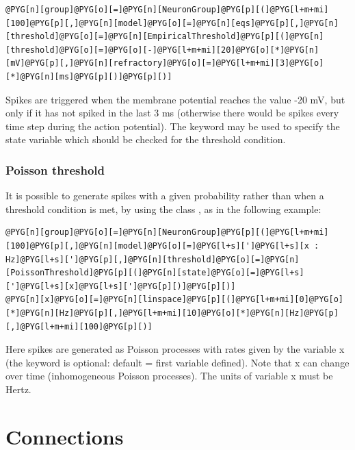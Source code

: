 \documentclass[letterpaper,10pt,english]{manual}
\begin{document}
\begin{Verbatim}[commandchars=@\[\]]
@PYG[n][group]@PYG[o][=]@PYG[n][NeuronGroup]@PYG[p][(]@PYG[l+m+mi][100]@PYG[p][,]@PYG[n][model]@PYG[o][=]@PYG[n][eqs]@PYG[p][,]@PYG[n][threshold]@PYG[o][=]@PYG[n][EmpiricalThreshold]@PYG[p][(]@PYG[n][threshold]@PYG[o][=]@PYG[o][-]@PYG[l+m+mi][20]@PYG[o][*]@PYG[n][mV]@PYG[p][,]@PYG[n][refractory]@PYG[o][=]@PYG[l+m+mi][3]@PYG[o][*]@PYG[n][ms]@PYG[p][)]@PYG[p][)]
\end{Verbatim}

Spikes are triggered when the membrane potential reaches the value -20 mV, but only if it
has not spiked in the last 3 ms (otherwise there would be spikes every time step during the action
potential). The  keyword may be used to specify the state variable which should be checked
for the threshold condition.


\subsubsection{Poisson threshold}

It is possible to generate spikes with a given probability rather than when a threshold condition
is met, by using the class , as in the following example:

\begin{Verbatim}[commandchars=@\[\]]
@PYG[n][group]@PYG[o][=]@PYG[n][NeuronGroup]@PYG[p][(]@PYG[l+m+mi][100]@PYG[p][,]@PYG[n][model]@PYG[o][=]@PYG[l+s][']@PYG[l+s][x : Hz]@PYG[l+s][']@PYG[p][,]@PYG[n][threshold]@PYG[o][=]@PYG[n][PoissonThreshold]@PYG[p][(]@PYG[n][state]@PYG[o][=]@PYG[l+s][']@PYG[l+s][x]@PYG[l+s][']@PYG[p][)]@PYG[p][)]
@PYG[n][x]@PYG[o][=]@PYG[n][linspace]@PYG[p][(]@PYG[l+m+mi][0]@PYG[o][*]@PYG[n][Hz]@PYG[p][,]@PYG[l+m+mi][10]@PYG[o][*]@PYG[n][Hz]@PYG[p][,]@PYG[l+m+mi][100]@PYG[p][)]
\end{Verbatim}

Here spikes are generated as Poisson processes with rates given by the variable x
(the  keyword is optional: default = first variable defined). Note that x can
change over time (inhomogeneous Poisson processes). The units of variable x must be Hertz.

\resetcurrentobjects
\hypertarget{--doc-connections}{}

\section{Connections}
\end{document}
